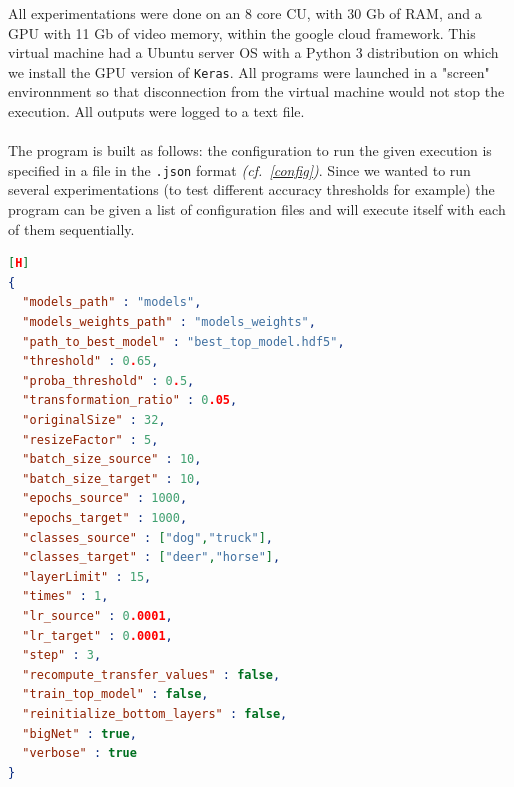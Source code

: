 \documentclass[11 pt]{article}
\begin{document}
All experimentations were done on an 8 core CU, with 30 Gb of RAM, and a GPU with 11 Gb of video memory, within the google cloud framework. This virtual machine had a Ubuntu server OS with a Python 3 distribution on which we install the GPU version of \texttt{Keras}. All programs were launched in a "screen" environnment so that disconnection from the virtual machine would not stop the execution. All outputs were logged to a text file.  

\paragraph{}The program is built as follows: the configuration to run the given execution is specified in a file in the \texttt{.json} format \textit{(cf.~\ref{config})}. Since we wanted to run several experimentations (to test different accuracy thresholds for example) the program can be given a list of configuration files and will execute itself with each of them sequentially. 

\begin{lstlisting}[language=json,firstnumber=1,caption={configuration example},label={config}][H]
{
  "models_path" : "models",
  "models_weights_path" : "models_weights",
  "path_to_best_model" : "best_top_model.hdf5",
  "threshold" : 0.65,
  "proba_threshold" : 0.5,
  "transformation_ratio" : 0.05,
  "originalSize" : 32,
  "resizeFactor" : 5,
  "batch_size_source" : 10,
  "batch_size_target" : 10,
  "epochs_source" : 1000,
  "epochs_target" : 1000,
  "classes_source" : ["dog","truck"],
  "classes_target" : ["deer","horse"],
  "layerLimit" : 15,
  "times" : 1,
  "lr_source" : 0.0001,
  "lr_target" : 0.0001,
  "step" : 3,
  "recompute_transfer_values" : false,
  "train_top_model" : false,
  "reinitialize_bottom_layers" : false,
  "bigNet" : true,
  "verbose" : true
}
\end{lstlisting}
\end{document}
